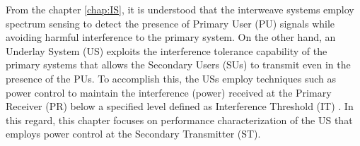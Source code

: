 From the chapter \ref{chap:IS}, it is understood that the interweave systems employ spectrum sensing to detect the presence of Primary User (PU) signals while avoiding harmful interference to the primary system. On the other hand, an Underlay System (US) exploits the interference tolerance capability of the primary systems that allows the Secondary Users (SUs) to transmit even in the presence of the PUs. To accomplish this, the USs employ techniques such as power control to maintain the interference (power) received at the Primary Receiver (PR) below a specified level defined as Interference Threshold (IT) \cite{Xing07}. In this regard, this chapter focuses on performance characterization of the US that employs power control at the Secondary Transmitter (ST).  


